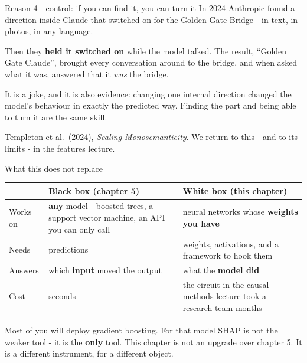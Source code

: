 \documentclass[aspectratio=169]{beamer}
\newcommand{\keybox}[1]{%
  \begin{tcolorbox}[colback=armblue!8, colframe=armblue, boxrule=0.6pt, arc=2pt]
  #1
  \end{tcolorbox}}
\newcommand{\watchbox}[1]{%
  \begin{tcolorbox}[colback=armorange!12, colframe=armorange, boxrule=0.6pt, arc=2pt]
  #1
  \end{tcolorbox}}
\begin{document}
\begin{frame}{Reason 4 - control: if you can find it, you can turn it}
  \vspace{0.6em}
  In 2024 Anthropic found a direction inside Claude that switched on for the Golden Gate Bridge -
  in text, in photos, in any language.

  \vspace{0.7em}
  Then they \textbf{held it switched on} while the model talked. The result, ``Golden Gate
  Claude'', brought every conversation around to the bridge, and when asked what it was,
  answered that it \emph{was} the bridge.

  \vspace{0.9em}
  \keybox{It is a joke, and it is also evidence: changing one internal direction changed the model's
  behaviour in exactly the predicted way. Finding the part and being able to turn it are the same
  skill.}

  \vspace{0.4em}
  {\footnotesize Templeton et al.\ (2024), \emph{Scaling Monosemanticity}. We return to this -
  and to its limits - in the features lecture.}
\end{frame}

\begin{frame}{What this does not replace}
  \vspace{0.4em}
  \begin{center}
  \small
  \begin{tabular}{@{}p{}p{}p{}@{}}
    \toprule
    & \textbf{Black box} (chapter 5) & \textbf{White box} (this chapter)\\
    \midrule
    Works on & \textbf{any} model - boosted trees, a support vector machine, an API you can
      only call & neural networks whose \textbf{weights you have}\\[0.25em]
    Needs & predictions & weights, activations, and a framework to hook them\\[0.25em]
    Answers & which \textbf{input} moved the output & what the \textbf{model did}\\[0.25em]
    Cost & seconds & the circuit in the causal-methods lecture took a research team months\\
    \bottomrule
  \end{tabular}
  \end{center}

  \vspace{0.2em}
  \watchbox{Most of you will deploy gradient boosting. For that model SHAP is not the weaker
  tool - it is the \textbf{only} tool. This chapter is not an upgrade over chapter 5. It is a
  different instrument, for a different object.}
\end{frame}
\end{document}
